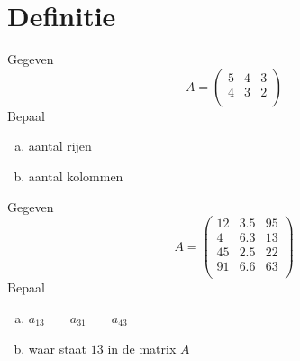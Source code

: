 \documentclass[12pt,twoside]{article}
\begin{document}
\section{Definitie}

\begin{oefening}
Gegeven
$$A=\begin{pmatrix}
5 & 4 & 3\\
4 & 3 & 2\\
\end{pmatrix}$$
Bepaal
\begin{enumerate}[(a)]
  \item aantal rijen
  \item aantal kolommen
\end{enumerate}
\end{oefening}

\begin{oefening}
Gegeven
$$A=\begin{pmatrix}
12 & 3.5 & 95\\
4  & 6.3 & 13\\
45 & 2.5 & 22\\
91 & 6.6 & 63\\
\end{pmatrix}$$
Bepaal
\begin{enumerate}[(a)]
  \item $a_{13} \qquad a_{31} \qquad a_{43}$
  \item waar staat $13$ in de matrix $A$
\end{enumerate}
\end{oefening}
\end{document}
